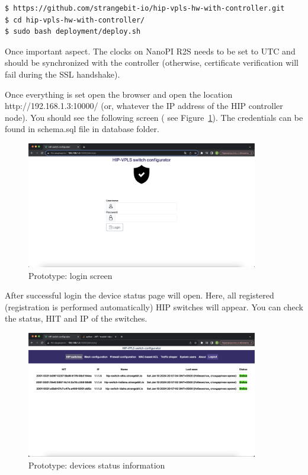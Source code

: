 \begin{verbatim}
$ https://github.com/strangebit-io/hip-vpls-hw-with-controller.git
$ cd hip-vpls-hw-with-controller/
$ sudo bash deployment/deploy.sh
\end{verbatim}

Once important aspect. The clocks on NanoPI R2S needs to be set to UTC and should be
synchronized with the controller (otherwise, certificate verification will fail during
the SSL handshake).

Once everything is set open the browser and open the location http://192.168.1.3:10000/ (or, 
whatever the IP address of the HIP controller node). You should see the following screen (
see Figure~\ref{fig:login}). The credentials can be found in schema.sql file in database folder. 

\begin{figure}[h!]
\centering
\includegraphics[width=0.9\textwidth]{graphics/login_screen.png}
\caption{Prototype: login screen}
\label{fig:login}
\end{figure}

After successful login the device status page will open. Here, all registered (registration is 
performed automatically) HIP switches will appear. You can check the status, HIT and IP of the 
switches.

\begin{figure}[h!]
\centering
\includegraphics[width=0.9\textwidth]{graphics/devices.png}
\caption{Prototype: devices status information}
\label{fig:devices}
\end{figure}


